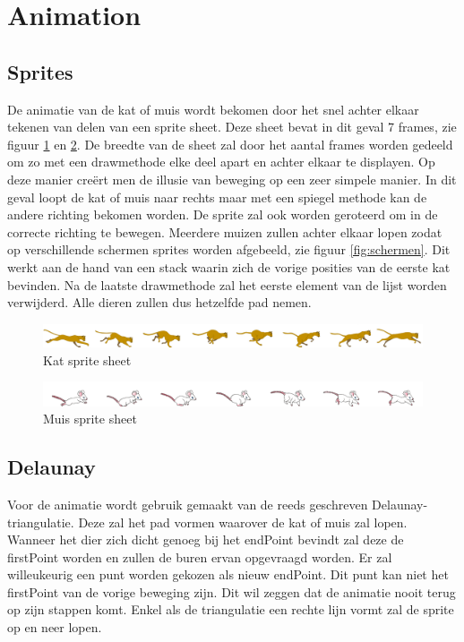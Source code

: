 \section{Animation}


\subsection{Sprites}

De animatie van de kat of muis wordt bekomen door het snel achter elkaar tekenen van delen van een sprite sheet. Deze sheet bevat in dit geval 7 frames, zie figuur \ref{fig:cat} en \ref{fig:mouse}. De breedte van de sheet zal door het aantal frames worden gedeeld om zo met een drawmethode elke deel apart en achter elkaar te displayen. Op deze manier creërt men de illusie van beweging op een zeer simpele manier. In dit geval loopt de kat of muis naar rechts maar met een spiegel methode kan de andere richting bekomen worden. De sprite zal ook worden geroteerd om in de correcte richting te bewegen. Meerdere muizen zullen achter elkaar lopen zodat op verschillende schermen sprites worden afgebeeld, zie figuur \ref{fig:schermen}. Dit werkt aan de hand van een stack waarin zich de vorige posities van de eerste kat bevinden. Na de laatste drawmethode zal het eerste element van de lijst worden verwijderd. Alle dieren zullen dus hetzelfde pad nemen.

\begin{figure}[H]
\centering
\includegraphics[scale=0.2]{img/cat2.png}
\caption{Kat sprite sheet \cite{catsprite}}
\label{fig:cat}
\end{figure}

\begin{figure}[H]
\centering
\includegraphics[scale=0.8]{img/mouse2_trans.png}
\caption{Muis sprite sheet \cite{mousesprite}}
\label{fig:mouse}
\end{figure}


\newpage
\subsection{Delaunay}

Voor de animatie wordt gebruik gemaakt van de reeds geschreven Delaunay-triangulatie. Deze zal het pad vormen waarover de kat of muis zal lopen. Wanneer het dier zich dicht genoeg bij het endPoint bevindt zal deze de firstPoint worden en zullen de buren ervan opgevraagd worden. Er zal willeukeurig een punt worden gekozen als nieuw endPoint. Dit punt kan niet het firstPoint van de vorige beweging zijn. Dit wil zeggen dat de animatie nooit terug op zijn stappen komt. Enkel als de triangulatie een rechte lijn vormt zal de sprite op en neer lopen. 

